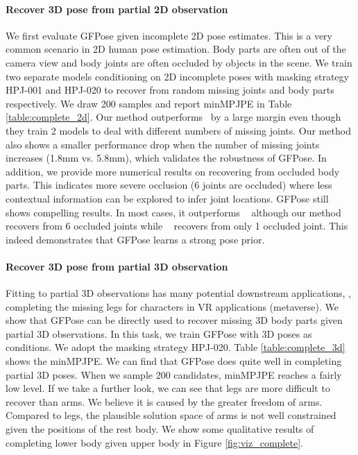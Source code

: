 \documentclass[10pt,twocolumn,letterpaper]{article}
\begin{document}
\paragraph{Recover 3D pose from partial 2D observation}
We first evaluate GFPose given incomplete 2D pose estimates. This is a very common scenario in 2D human pose estimation. Body parts are often out of the camera view and body joints are often occluded by objects in the scene.
We train two separate models conditioning on 2D incomplete poses with masking strategy HPJ-001 and HPJ-020 to recover from random missing joints and body parts respectively. We draw 200 samples and report minMPJPE in Table \ref{table:complete_2d}. Our method outperforms~\cite{Li_2019_CVPR} by a large margin even though they train 2 models to deal with different numbers of missing joints. Our method also shows a smaller performance drop when the number of missing joints increases (1.8mm vs. 5.8mm), which validates the robustness of GFPose. In addition, we provide more numerical results on recovering from occluded body parts. This indicates more severe occlusion (6 joints are occluded) where less contextual information can be explored to infer joint locations. GFPose still shows compelling results. In most cases, it outperforms ~\cite{Li_2019_CVPR} although our method recovers from 6 occluded joints while ~\cite{Li_2019_CVPR} recovers from only 1 occluded joint. This indeed demonstrates that GFPose learns a strong pose prior.

\paragraph{Recover 3D pose from partial 3D observation}
Fitting to partial 3D observations has many potential downstream applications, \eg, completing the missing legs for characters in VR applications (metaverse). We show that GFPose can be directly used to recover missing 3D body parts given partial 3D observations.
In this task, we train GFPose with 3D poses as conditions. We adopt the masking strategy HPJ-020.
Table \ref{table:complete_3d} shows the minMPJPE. We can find that GFPose does quite well in completing partial 3D poses. When we sample 200 candidates, minMPJPE reaches a fairly low level. 
If we take a further look, we can see that legs are more difficult to recover than arms. We believe it is caused by the greater freedom of arms. Compared to legs, the plausible solution space of arms is not well constrained given the positions of the rest body. We show some qualitative results of completing lower body given upper body in Figure \ref{fig:viz_complete}.
\end{document}
